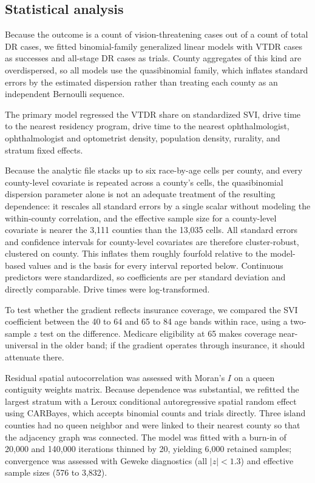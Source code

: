 \documentclass[11pt]{article}
\begin{document}
\subsection{Statistical analysis}

Because the outcome is a count of vision-threatening cases out of a count of
total DR cases, we fitted binomial-family generalized linear models with VTDR
cases as successes and all-stage DR cases as trials. County aggregates of this
kind are overdispersed, so all models use the quasibinomial family, which
inflates standard errors by the estimated dispersion rather than treating each
county as an independent Bernoulli sequence.

The primary model regressed the VTDR share on standardized SVI, drive time to
the nearest residency program, drive time to the nearest ophthalmologist,
ophthalmologist and optometrist density, population density, rurality, and
stratum fixed effects.

Because the analytic file stacks up to six race-by-age cells per county, and
every county-level covariate is repeated across a county's cells, the
quasibinomial dispersion parameter alone is not an adequate treatment of the
resulting dependence: it rescales all standard errors by a single scalar
without modeling the within-county correlation, and the effective sample size
for a county-level covariate is nearer the 3,111 counties than the 13,035
cells. All standard errors and confidence intervals for county-level covariates
are therefore cluster-robust, clustered on county. This inflates them roughly
fourfold relative to the model-based values and is the basis for every interval
reported below. Continuous predictors were standardized, so coefficients
are per standard deviation and directly comparable. Drive times were
log-transformed.

To test whether the gradient reflects insurance coverage, we compared the SVI
coefficient between the 40 to 64 and 65 to 84 age bands within race, using a
two-sample $z$ test on the difference. Medicare eligibility at 65 makes coverage
near-universal in the older band; if the gradient operates through insurance, it
should attenuate there.

Residual spatial autocorrelation was assessed with Moran's $I$ on a queen
contiguity weights matrix. Because dependence was substantial, we refitted the
largest stratum with a Leroux conditional autoregressive spatial random
effect using CARBayes,\citep{carbayes} which accepts binomial counts and trials
directly. Three island counties had no queen neighbor and were linked to their
nearest county so that the adjacency graph was connected. The model was fitted
with a burn-in of 20,000 and 140,000 iterations thinned by 20, yielding 6,000
retained samples; convergence was assessed with Geweke diagnostics (all $|z|<1.3$)
and effective sample sizes (576 to 3,832).
\end{document}
